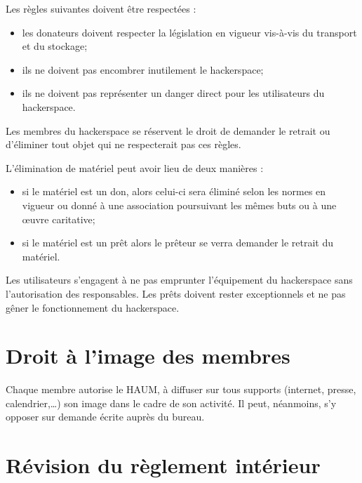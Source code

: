 \documentclass[a4paper, 11pt]{article}
\newcommand{\nomHS}{HAUM}
\begin{document}
Les règles suivantes doivent être respectées :

\begin{itemize}
    \item les donateurs doivent respecter la législation en vigueur vis-à-vis du transport et du stockage;
    \item ils ne doivent pas encombrer inutilement le hackerspace;
    \item ils ne doivent pas représenter un danger direct pour les utilisateurs du hackerspace.
\end{itemize}

Les membres du hackerspace se réservent le droit de demander le retrait ou d'éliminer tout objet qui ne respecterait pas ces règles.

L'élimination de matériel peut avoir lieu de deux manières :

\begin{itemize}
    \item si le matériel est un don, alors celui-ci sera éliminé selon les normes en vigueur ou donné à une association poursuivant les mêmes buts ou à une \oe{}uvre caritative;
    \item si le matériel est un prêt alors le prêteur se verra demander le retrait du matériel.
\end{itemize}

Les utilisateurs s'engagent à ne pas emprunter l'équipement du hackerspace sans l'autorisation des responsables. Les prêts doivent rester exceptionnels et ne pas gêner le fonctionnement du hackerspace.


\section{Droit à l'image des membres} %

Chaque membre autorise le \nomHS{}, à diffuser sur tous supports (internet, presse, calendrier,\dots{}) son image dans le cadre de son activité. Il peut, néanmoins, s'y opposer sur demande écrite auprès du bureau.


\section{Révision du règlement intérieur} %
\end{document}
